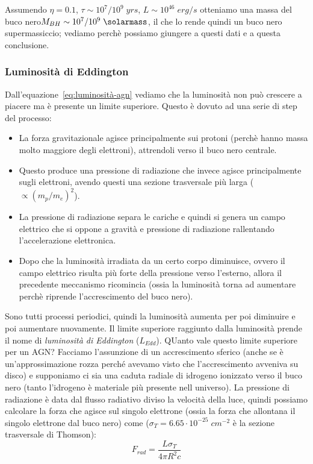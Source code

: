 Assumendo $\eta = 0.1$, $\tau \sim 10^7/10^9 \;\si{yrs}$, $L \sim 10^{46} \;\si{erg}/\si{s}$ otteniamo una massa del buco nero$M_{BH} \sim 10^7/10^9 \;\si{\solarmass}$, il che lo rende quindi un buco nero supermassiccio; vediamo perchè possiamo giungere a questi dati e a questa conclusione.

\subsubsection{Luminosità di Eddington}
Dall'equazione~\ref{eq:luminosità-agn} vediamo che la luminosità non può crescere a piacere ma è presente un limite superiore. Questo è dovuto ad una serie di step del processo:
\begin{itemize}
    \item La forza gravitazionale agisce principalmente sui protoni (perchè hanno massa molto maggiore degli elettroni), attrendoli verso il buco nero centrale.
    \item Questo produce una pressione di radiazione che invece agisce principalmente sugli elettroni, avendo questi una sezione trasversale più larga ($\propto (m_p/m_e)^2$).
    \item La pressione di radiazione separa le cariche e quindi si genera un campo elettrico che si oppone a gravità e pressione di radiazione rallentando l'accelerazione elettronica.
    \item Dopo che la luminosità irradiata da un certo corpo diminuisce, ovvero il campo elettrico risulta più forte della pressione verso l'esterno, allora il precedente meccanismo ricomincia (ossia la luminosità torna ad aumentare perchè riprende l'accrescimento del buco nero).
\end{itemize}
Sono tutti processi periodici, quindi la luminosità aumenta per poi diminuire e poi aumentare nuovamente. Il limite superiore raggiunto dalla luminosità prende il nome di \emph{luminosità di Eddington} ($L_{Edd}$). QUanto vale questo limite superiore per un AGN? Facciamo l'assunzione di un accrescimento sferico (anche se è un’approssimazione rozza perché avevamo visto che l’accrescimento avveniva su disco) e supponiamo ci sia una caduta radiale di idrogeno ionizzato verso il buco nero (tanto l'idrogeno è materiale più presente nell universo). La pressione di radiazione è data dal flusso radiativo diviso la velocità della luce, quindi possiamo calcolare la forza che agisce sul singolo elettrone (ossia la forza che allontana il singolo elettrone dal buco nero) come ($\sigma_T = 6.65 \cdot 10^{-25} \;\si{cm^{-2}}$ è la sezione trasversale di Thomson):
\begin{equation*}
    F_{rad} = \frac{L\sigma_T}{4\pi R^2 c}
\end{equation*}

